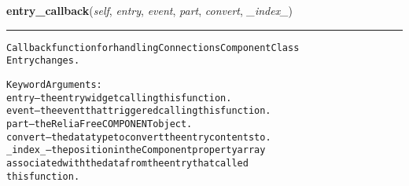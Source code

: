     \vspace{0.5ex}

\hspace{.8\funcindent}\begin{boxedminipage}{\funcwidth}

    \raggedright \textbf{entry\_callback}(\textit{self}, \textit{entry}, \textit{event}, \textit{part}, \textit{convert}, \textit{\_index\_})

    \vspace{-1.5ex}

    \rule{\textwidth}{0.5\fboxrule}
\setlength{\parskip}{2ex}
\begin{alltt}
Callback function for handling Connections Component Class
Entry changes.

Keyword Arguments:
  entry -- the entry widget calling this function.
  event -- the event that triggered calling this function.
   part -- the ReliaFree COMPONENT object.
convert -- the data type to convert the entry contents to.
\_index\_ -- the position in the Component property array
           associated with the data from the entry that called
           this function.
\end{alltt}

\setlength{\parskip}{1ex}
    \end{boxedminipage}

